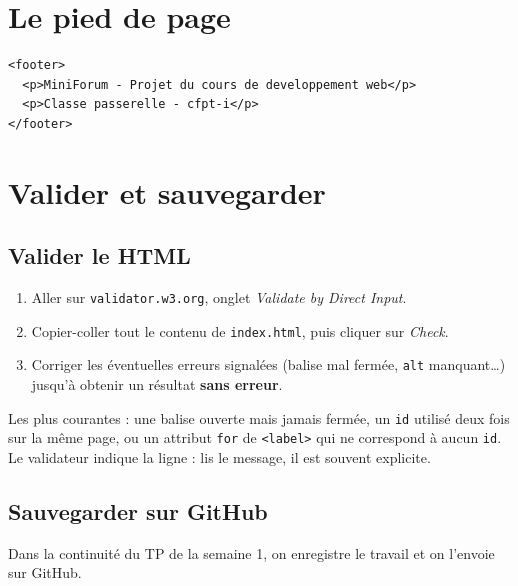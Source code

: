 \documentclass[a4paper,11pt]{article}
\begin{document}
\section{Le pied de page}

\begin{lstlisting}[language=HTML5, caption={Contenu du footer}]
<footer>
  <p>MiniForum - Projet du cours de developpement web</p>
  <p>Classe passerelle - cfpt-i</p>
</footer>
\end{lstlisting}

\section{Valider et sauvegarder}

\subsection{Valider le HTML}

\begin{enumerate}
  \item Aller sur \texttt{validator.w3.org}, onglet \textit{Validate by Direct Input}.
  \item Copier-coller tout le contenu de \texttt{index.html}, puis cliquer sur \textit{Check}.
  \item Corriger les éventuelles erreurs signalées (balise mal fermée, \texttt{alt} manquant\dots) jusqu'à obtenir un résultat \textbf{sans erreur}.
\end{enumerate}

\begin{tcolorbox}[astuce, title={Erreurs fréquentes}]
Les plus courantes : une balise ouverte mais jamais fermée, un \texttt{id} utilisé deux fois sur la même page, ou un attribut \texttt{for} de \texttt{<label>} qui ne correspond à aucun \texttt{id}. Le validateur indique la ligne : lis le message, il est souvent explicite.
\end{tcolorbox}

\subsection{Sauvegarder sur GitHub}

Dans la continuité du TP de la semaine 1, on enregistre le travail et on l'envoie sur GitHub.
\end{document}
